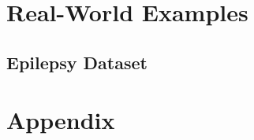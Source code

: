 \documentclass[12pt]{article}
\begin{document}
\section{Real-World Examples}


\subsection{Epilepsy Dataset}


\section*{Appendix}




\end{document}
